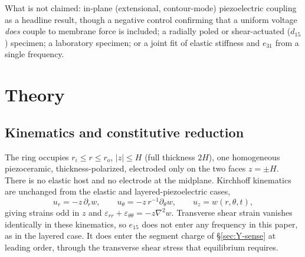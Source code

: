 \documentclass[11pt]{article}
\begin{document}
What is not claimed: in-plane (extensional, contour-mode) piezoelectric
coupling as a headline result, though a negative control confirming that
a uniform voltage \emph{does} couple to membrane force is included; a
radially poled or shear-actuated ($d_{15}$) specimen; a laboratory
specimen; or a joint fit of elastic stiffness and $e_{31}$ from a single
frequency.

\section{Theory}\label{sec:theory}

\subsection{Kinematics and constitutive reduction}\label{sec:kinematics}
The ring occupies $r_i\le r\le r_o$, $\lvert z\rvert\le H$ (full thickness
$2H$), one homogeneous piezoceramic, thickness-polarized, electroded only
on the two faces $z=\pm H$. There is no elastic host and no electrode at
the midplane. Kirchhoff kinematics are unchanged from the elastic and
layered-piezoelectric cases,
\begin{equation}
u_r=-z\,\partial_r w,\qquad
u_\theta=-z\,r^{-1}\partial_\theta w,\qquad
u_z=w(r,\theta,t),
\end{equation}
giving strains odd in $z$ and $\varepsilon_{rr}+\varepsilon_{\theta\theta}
=-z\nabla^2 w$. Transverse shear strain vanishes identically in these
kinematics, so $e_{15}$ does not enter any frequency in this paper, as in
the layered case. It does enter the segment charge of
\S\ref{sec:Y-sense} at leading order, through the transverse shear
stress that equilibrium requires.
\end{document}
